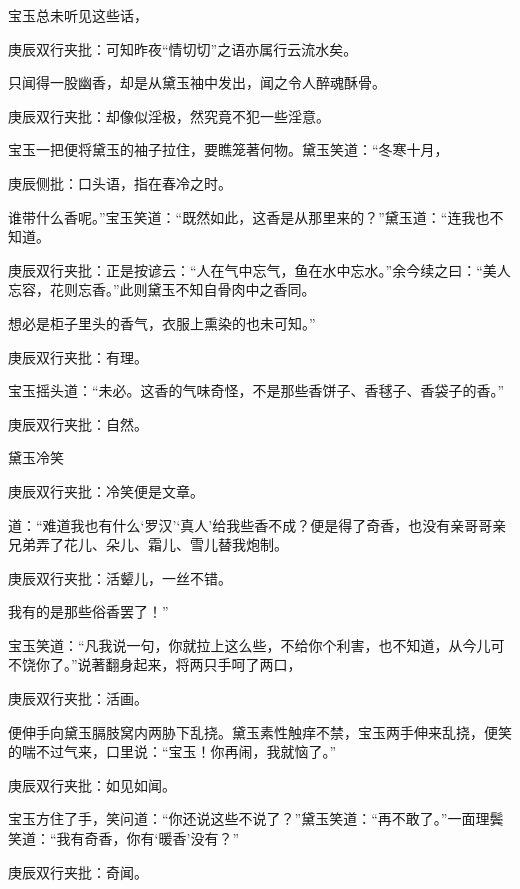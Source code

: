 \begin{parag}


    宝玉总未听见这些话，\begin{note}庚辰双行夹批：可知昨夜“情切切”之语亦属行云流水矣。\end{note}只闻得一股幽香，却是从黛玉袖中发出，闻之令人醉魂酥骨。\begin{note}庚辰双行夹批：却像似淫极，然究竟不犯一些淫意。\end{note}宝玉一把便将黛玉的袖子拉住，要瞧笼著何物。黛玉笑道：“冬寒十月，\begin{note}庚辰侧批：口头语，指在春冷之时。\end{note}谁带什么香呢。”宝玉笑道：“既然如此，这香是从那里来的？”黛玉道：“连我也不知道。\begin{note}庚辰双行夹批：正是按谚云：“人在气中忘气，鱼在水中忘水。”余今续之曰：“美人忘容，花则忘香。”此则黛玉不知自骨肉中之香同。\end{note}想必是柜子里头的香气，衣服上熏染的也未可知。”\begin{note}庚辰双行夹批：有理。\end{note}宝玉摇头道：“未必。这香的气味奇怪，不是那些香饼子、香毬子、香袋子的香。”\begin{note}庚辰双行夹批：自然。\end{note}黛玉冷笑\begin{note}庚辰双行夹批：冷笑便是文章。\end{note}道：“难道我也有什么‘罗汉’‘真人’给我些香不成？便是得了奇香，也没有亲哥哥亲兄弟弄了花儿、朵儿、霜儿、雪儿替我炮制。\begin{note}庚辰双行夹批：活颦儿，一丝不错。\end{note}我有的是那些俗香罢了！”
\end{parag}


\begin{parag}


    宝玉笑道：“凡我说一句，你就拉上这么些，不给你个利害，也不知道，从今儿可不饶你了。”说著翻身起来，将两只手呵了两口，\begin{note}庚辰双行夹批：活画。\end{note}便伸手向黛玉膈肢窝内两胁下乱挠。黛玉素性触痒不禁，宝玉两手伸来乱挠，便笑的喘不过气来，口里说：“宝玉！你再闹，我就恼了。”\begin{note}庚辰双行夹批：如见如闻。\end{note}宝玉方住了手，笑问道：“你还说这些不说了？”黛玉笑道：“再不敢了。”一面理鬓笑道：“我有奇香，你有‘暖香’没有？”\begin{note}庚辰双行夹批：奇闻。\end{note}
\end{parag}


